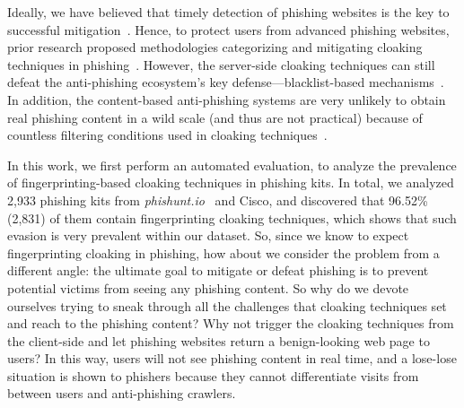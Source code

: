 Ideally, we have believed that timely detection of phishing websites is the key to successful mitigation~\cite{oest2020sunrise, zhang2021crawlphish}.
Hence, to protect users from advanced phishing websites, prior research proposed methodologies categorizing and mitigating cloaking techniques in phishing~\cite{oest2018inside, oest2019phishfarm, zhang2021crawlphish}.
However, the server-side cloaking techniques can still defeat the anti-phishing ecosystem's key defense---blacklist-based mechanisms~\cite{oest2019phishfarm}.
In addition, the content-based anti-phishing systems are very unlikely to obtain real phishing content in a wild scale (and thus are not practical) because of countless filtering conditions used in cloaking techniques~\cite{oest2018inside, oest2020phishtime}.


In this work, we first perform an automated evaluation, to analyze the prevalence of fingerprinting-based cloaking techniques in phishing kits.
In total, we analyzed 2,933 phishing kits from \emph{phishunt.io}~\cite{phishunt} and Cisco, and discovered that 96.52\% (2,831) of them contain fingerprinting cloaking techniques, which shows that such evasion is very prevalent within our dataset.
So, since we know to expect fingerprinting cloaking in phishing, how about we consider the problem from a different angle:
the ultimate goal to mitigate or defeat phishing is to prevent potential victims from seeing any phishing content.
So why do we devote ourselves trying to sneak through all the challenges that cloaking techniques set and reach to the phishing content?
Why not trigger the cloaking techniques from the client-side and let phishing websites return a benign-looking web page to users?
In this way, users will not see phishing content in real time, and a lose-lose situation is shown to phishers because they cannot differentiate visits from between users and anti-phishing crawlers.

